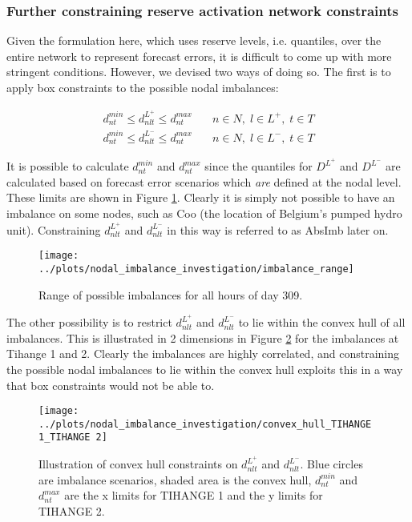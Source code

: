 \documentclass[number,times]{elsarticle}
\begin{document}
\subsubsection{Further constraining reserve activation network constraints} \label{sec:further_constraining_operating_reserve_network_activation_constraints}

Given the formulation here, which uses reserve levels, i.e. quantiles, over the entire network to represent forecast errors, it is difficult to come up with more stringent conditions. However, we devised two ways of doing so. The first is to apply box constraints to the possible nodal imbalances:

\begin{align}
    d_{nt}^{min} \leq d_{nlt}^{L^+} \leq d_{nt}^{max} & \quad n \in N, \; l \in L^+, \; t \in T \\
    d_{nt}^{min} \leq d_{nlt}^{L^-} \leq d_{nt}^{max} & \quad n \in N, \; l \in L^-, \; t \in T
\end{align}

It is possible to calculate $d_{nt}^{min}$ and $d_{nt}^{max}$ since the quantiles for $D^{L^+}$ and $D^{L^-}$ are calculated based on forecast error scenarios which \emph{are} defined at the nodal level. These limits are shown in Figure \ref{fig:imbalance_range}. Clearly it is simply not possible to have an imbalance on some nodes, such as Coo (the location of Belgium's pumped hydro unit). Constraining $d_{nlt}^{L^+}$ and $d_{nlt}^{L^-}$ in this way is referred to as AbsImb later on.

\begin{figure}[ht]
    \centering
    \texttt{[image: ../plots/nodal\_imbalance\_investigation/imbalance\_range]}
    \caption{Range of possible imbalances for all hours of day 309.\label{fig:imbalance_range}}
\end{figure}

The other possibility is to restrict $d_{nlt}^{L^+}$ and $d_{nlt}^{L^-}$ to lie within the convex hull of all imbalances. This is illustrated in 2 dimensions in Figure \ref{fig:convex_hull_tihange} for the imbalances at Tihange 1 and 2. Clearly the imbalances are highly correlated, and constraining the possible nodal imbalances to lie within the convex hull exploits this in a way that box constraints would not be able to.

\begin{figure}[ht]
    \centering
    \texttt{[image: ../plots/nodal\_imbalance\_investigation/convex\_hull\_TIHANGE 1\_TIHANGE 2]}
    \caption{Illustration of convex hull constraints on $d_{nlt}^{L^+}$ and $d_{nlt}^{L^-}$. Blue circles are imbalance scenarios, shaded area is the convex hull, $d_{nt}^{min}$ and $d_{nt}^{max}$ are the x limits for TIHANGE 1 and the y limits for TIHANGE 2. \label{fig:convex_hull_tihange}}
\end{figure}
\end{document}
